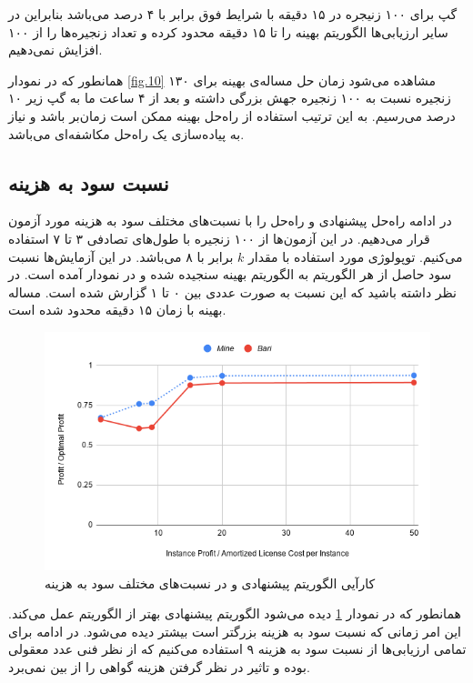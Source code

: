 گپ برای ۱۰۰ زنیجره در ۱۵ دقیقه با شرایط فوق برابر با ۴ درصد می‌باشد بنابراین
در سایر ارزیابی‌ها الگوریتم بهینه را تا ۱۵ دقیقه محدود کرده و تعداد زنجیره‌ها را از ۱۰۰ افزایش نمی‌دهیم.

همانطور که در نمودار \ref{fig.10} مشاهده می‌شود زمان حل مساله‌ی بهینه برای ۱۳۰ زنجیره نسبت به ۱۰۰ زنجیره جهش بزرگی داشته
و بعد از ۴ ساعت ما به گپ زیر ۱۰ درصد می‌رسیم.
به این ترتیب استفاده از راه‌حل بهینه ممکن است زمان‌بر باشد و نیاز به پیاده‌سازی یک راه‌حل مکاشفه‌ای می‌باشد.

\subsection{نسبت سود به هزینه}

در ادامه راه‌حل پیشنهادی و راه‌حل \cite{Bari2015} را با نسبت‌های مختلف سود به هزینه مورد آزمون قرار می‌دهیم. 
در این آزمون‌ها از ۱۰۰ زنجیره با طول‌های تصادفی ۳ تا ۷ استفاده می‌کنیم.
توپولوژی مورد استفاده
با مقدار \(k\)
برابر با ۸
می‌باشد.
در این آزمایش‌ها نسبت سود حاصل از هر الگوریتم به الگوریتم بهینه سنجیده شده و در نمودار آمده است.
در نظر داشته باشید که این نسبت به صورت عددی بین ۰ تا ۱ گزارش شده است.
مساله بهینه با زمان ۱۵ دقیقه محدود شده است.


\begin{figure}[h]
\center\includegraphics[scale=.5]{images/chart-1}
\caption{کارآیی الگوریتم پیشنهادی و \cite{Bari2015} در نسبت‌های مختلف سود به هزینه}
\label{fig.4}
\end{figure}

همانطور که در نمودار \ref{fig.4} دیده می‌شود الگوریتم پیشنهادی بهتر از الگوریتم \cite{Bari2015} عمل می‌کند.
این امر زمانی که نسبت سود به هزینه بزرگتر است بیشتر دیده می‌شود.
در ادامه برای تمامی ارزیابی‌ها از نسبت سود به هزینه ۹ استفاده می‌کنیم که از نظر فنی عدد معقولی بوده و تاثیر در نظر گرفتن هزینه گواهی را از بین نمی‌برد.

